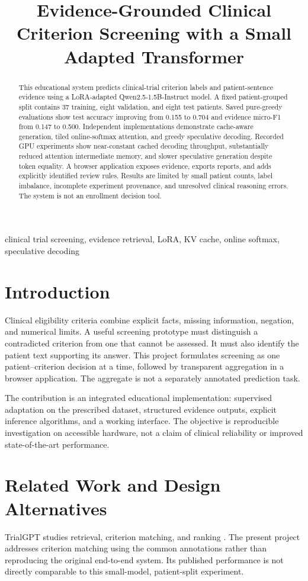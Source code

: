 \documentclass[conference]{IEEEtran}
\title{Evidence-Grounded Clinical Criterion Screening with a Small Adapted Transformer}
\author{\IEEEauthorblockN{Aaiz Ur Rehman Kazmi}
\IEEEauthorblockA{Roll No. 23I-0589\\Generative AI, Section A\\FAST-NUCES}}
\begin{document}
\maketitle
\begin{abstract}
This educational system predicts clinical-trial criterion labels and patient-sentence evidence using a LoRA-adapted Qwen2.5-1.5B-Instruct model. A fixed patient-grouped split contains 37 training, eight validation, and eight test patients. Saved pure-greedy evaluations show test accuracy improving from 0.155 to 0.704 and evidence micro-F1 from 0.147 to 0.500. Independent implementations demonstrate cache-aware generation, tiled online-softmax attention, and greedy speculative decoding. Recorded GPU experiments show near-constant cached decoding throughput, substantially reduced attention intermediate memory, and slower speculative generation despite token equality. A browser application exposes evidence, exports reports, and adds explicitly identified review rules. Results are limited by small patient counts, label imbalance, incomplete experiment provenance, and unresolved clinical reasoning errors. The system is not an enrollment decision tool.
\end{abstract}
\begin{IEEEkeywords}
clinical trial screening, evidence retrieval, LoRA, KV cache, online softmax, speculative decoding
\end{IEEEkeywords}

\section{Introduction}
Clinical eligibility criteria combine explicit facts, missing information, negation, and numerical limits. A useful screening prototype must distinguish a contradicted criterion from one that cannot be assessed. It must also identify the patient text supporting its answer. This project formulates screening as one patient--criterion decision at a time, followed by transparent aggregation in a browser application. The aggregate is not a separately annotated prediction task.

The contribution is an integrated educational implementation: supervised adaptation on the prescribed dataset, structured evidence outputs, explicit inference algorithms, and a working interface. The objective is reproducible investigation on accessible hardware, not a claim of clinical reliability or improved state-of-the-art performance.

\section{Related Work and Design Alternatives}
TrialGPT studies retrieval, criterion matching, and ranking \cite{trialgpt}. The present project addresses criterion matching using the common annotations rather than reproducing the original end-to-end system. Its published performance is not directly comparable to this small-model, patient-split experiment.
\end{document}
